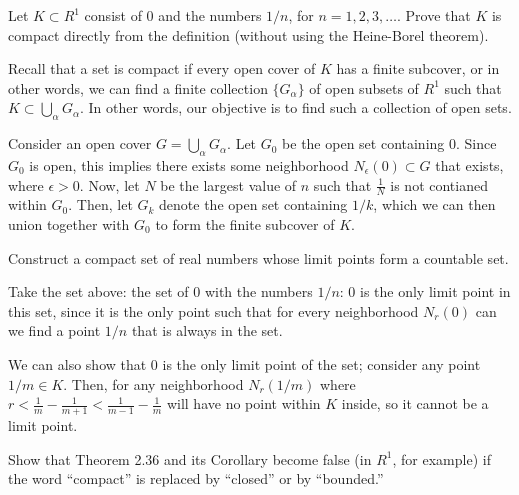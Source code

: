 \documentclass[10pt]{article}
\begin{document}
	\begin{problem}
		Let \( K \subset R^{1} \) consist of \( 0 \) and the numbers \( 1/n \), for \( n = 1, 2, 3, \dots \). 
		Prove that \( K \) is compact directly from the definition (without using the Heine-Borel theorem). 
	\end{problem}

	\begin{solution}
		Recall that a set is compact if every open cover of \( K \) has a finite subcover, or in other words, we can 
		find a finite collection \( \{G_{\alpha}\}  \) of open subsets of \( R^{1} \) such that 
		\( K \subset \bigcup_\alpha G_\alpha \). In other words, our objective is to find such a collection 
		of open sets. 

		Consider an open cover \( G = \bigcup_\alpha G_\alpha  \). 
		Let \( G_0 \) be the open set containing 0. Since \( G_0 \) 
		is open, this implies there exists some neighborhood \( N_\epsilon(0) \subset G \) that exists, where 
		\( \epsilon > 0 \). Now, let \( N  \) be the largest value of \( n \) such that \( \frac{1}{N} \) is 
		not contianed within \( G_0 \). Then, let \( G_k \) denote the open set containing \( 1 / k \), which 
		we can then union together with \( G_0 \) to form the finite subcover of \( K \). 
	\end{solution}
	
	\begin{problem}
		Construct a compact set of real numbers whose limit points form a countable set.  
	\end{problem}

	\begin{solution}
		Take the set above: the set of 0 with the numbers \( 1 / n \): 0 is the only limit point in this set, since 
		it is the only point such that for every neighborhood \( N_r(0) \) can we find a point \( 1 / n \) that 
		is always in the set. 

		We can also show that 0 is the only limit point of the set; consider any point \( 1 / m \in K \). Then, 
		for any neighborhood \( N_r(1 / m) \) where \( r < \frac{1}{m} - \frac{1}{m+1} < \frac{1}{m-1} - 
		\frac{1}{m}\) will have no point 
		within \( K \) inside, so it cannot be a limit point. 
	\end{solution}

	\begin{problem}
		Show that Theorem 2.36 and its Corollary become false (in \( R^{1} \), for example) if the 
		word ``compact'' is replaced by ``closed'' or by ``bounded.''
	\end{problem}
\end{document}
